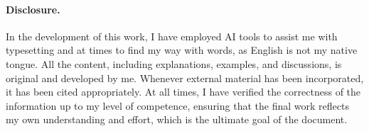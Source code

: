 \paragraph{Disclosure.}
{
  In the development of this work, I have employed AI tools to assist me with typesetting and at times to find my way with words, as English is not my native tongue. All the content, including explanations, examples, and discussions, is original and developed by me. Whenever external material has been incorporated, it has been cited appropriately. At all times, I have verified the correctness of the information up to my level of competence, ensuring that the final work reflects my own understanding and effort, which is the ultimate goal of the document.
}



